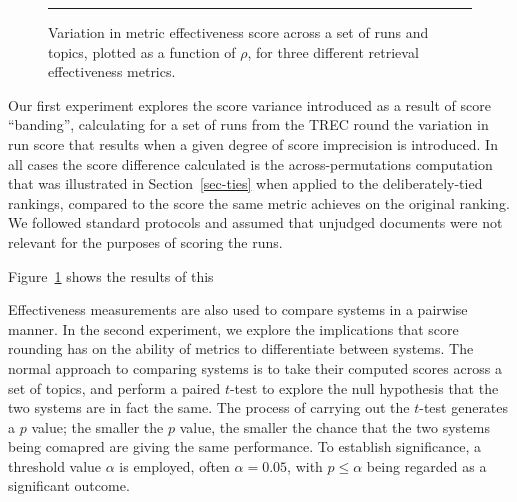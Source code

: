 \begin{figure}[t]
\centering
\rule{0.5mm}{45mm}
\caption{Variation in metric effectiveness score across a set of
{} runs and {} topics, plotted as a function of
$\rho$, for three different retrieval effectiveness metrics.
{}
{}
{}
\label{fig-scorevariation}}
\end{figure}

Our first experiment explores the score variance introduced as a
result of score ``banding'', calculating for a set of runs
from the {} TREC round the variation in run score
that results when a given degree of score imprecision is introduced.
In all cases the score difference calculated is the
across-permutations computation that was illustrated in
Section~\ref{sec-ties} when applied to the deliberately-tied
rankings, compared to the score the same metric achieves on the
original ranking.
We followed standard protocols and assumed that unjudged documents
were not relevant for the purposes of scoring the runs.

Figure~\ref{fig-scorevariation} shows the results of this
{} 


Effectiveness measurements are also used to compare systems in a
pairwise manner.
In the second experiment, we explore the implications that score
rounding has on the ability of metrics to differentiate between
systems.
The normal approach to comparing systems is to take their computed
scores across a set of topics, and perform a paired $t$-test to
explore the null hypothesis that the two systems are in fact the
same.
The process of carrying out the $t$-test generates a $p$ value; the
smaller the $p$ value, the smaller the chance that the two systems
being comapred are giving the same performance.
To establish significance, a threshold value $\alpha$ is employed,
often $\alpha=0.05$, with $p\le\alpha$ being regarded as a
significant outcome.

